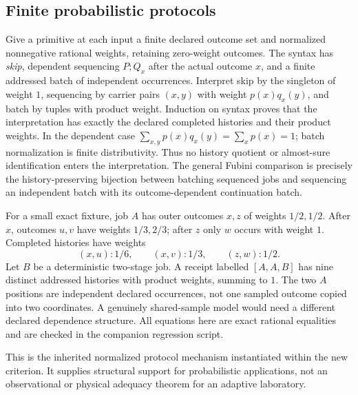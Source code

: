 \documentclass[11pt,a4paper]{article}
\theoremstyle{definition}
\begin{document}
\subsection{Finite probabilistic protocols}
Give a primitive at each input a finite declared outcome set and normalized
nonnegative rational weights, retaining zero-weight outcomes. The syntax has
\emph{skip}, dependent sequencing $P\mathbin{;}Q_x$ after the actual outcome
$x$, and a finite addressed batch of independent occurrences. Interpret skip
by the singleton of weight $1$, sequencing by carrier pairs $(x,y)$ with
weight $p(x)q_x(y)$, and batch by tuples with product weight.
Induction on syntax proves that the interpretation has exactly the declared
completed histories and their product weights. In the dependent case
$\sum_{x,y}p(x)q_x(y)=\sum_xp(x)=1$; batch normalization is finite
distributivity. Thus no history quotient or almost-sure identification enters
the interpretation. The general Fubini comparison is precisely the
history-preserving bijection between batching sequenced jobs and sequencing
an independent batch with its outcome-dependent continuation batch.

For a small exact fixture, job $A$ has outer outcomes $x,z$ of weights
$1/2,1/2$. After $x$, outcomes $u,v$ have weights $1/3,2/3$; after $z$ only
$w$ occurs with weight $1$. Completed histories have weights
\[
 (x,u):1/6,\qquad(x,v):1/3,\qquad(z,w):1/2.
\]
Let $B$ be a deterministic two-stage job. A receipt labelled $[A,A,B]$ has
nine distinct addressed histories with product weights, summing to $1$.
The two $A$ positions are independent declared occurrences, not one sampled
outcome copied into two coordinates. A genuinely shared-sample model would
need a different declared dependence structure. All equations here are exact
rational equalities and are checked in the companion regression script.

This is the inherited normalized protocol mechanism instantiated within the
new criterion. It supplies structural support for probabilistic applications,
not an observational or physical adequacy theorem for an adaptive laboratory.
\end{document}
